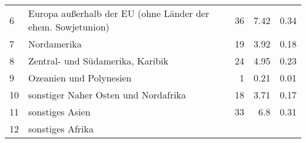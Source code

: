 \begin{longtable}{lXrrr}
     6 &
     \multicolumn{1}{X}{ Europa außerhalb der EU (ohne Länder der ehem. Sowjetunion)   } &


       \num{36} &
       \num[round-mode=places,round-precision=2]{7,42} &
         \num[round-mode=places,round-precision=2]{0,34} \\

     7 &
     \multicolumn{1}{X}{ Nordamerika   } &


       \num{19} &
       \num[round-mode=places,round-precision=2]{3,92} &
         \num[round-mode=places,round-precision=2]{0,18} \\

     8 &
     \multicolumn{1}{X}{ Zentral- und Südamerika, Karibik   } &


       \num{24} &
       \num[round-mode=places,round-precision=2]{4,95} &
         \num[round-mode=places,round-precision=2]{0,23} \\

     9 &
     \multicolumn{1}{X}{ Ozeanien und Polynesien   } &


       \num{1} &
       \num[round-mode=places,round-precision=2]{0,21} &
         \num[round-mode=places,round-precision=2]{0,01} \\

     10 &
     \multicolumn{1}{X}{ sonstiger Naher Osten und Nordafrika   } &


       \num{18} &
       \num[round-mode=places,round-precision=2]{3,71} &
         \num[round-mode=places,round-precision=2]{0,17} \\

     11 &
     \multicolumn{1}{X}{ sonstiges Asien   } &


       \num{33} &
       \num[round-mode=places,round-precision=2]{6,8} &
         \num[round-mode=places,round-precision=2]{0,31} \\

     12 &
     \multicolumn{1}{X}{ sonstiges Afrika   } &



\end{longtable}
